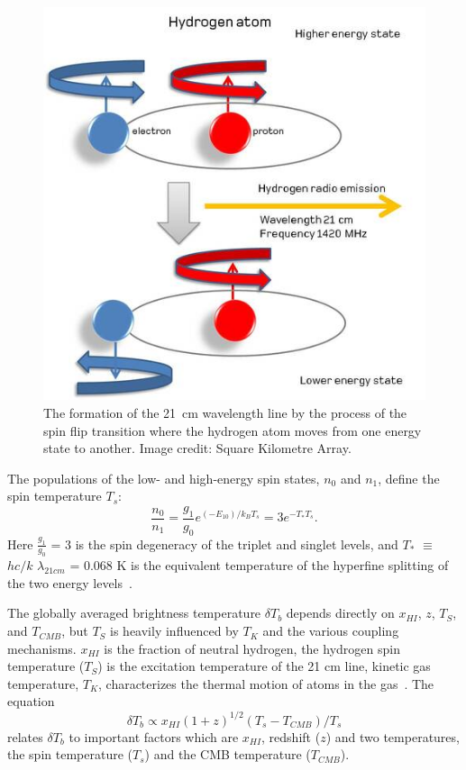 \begin{figure}
	\begin{center}
		\includegraphics[width=0.7\linewidth]{Figures/hydrogenemission1}
		\caption{The formation of the \SI{21}{cm} wavelength line by the process of the spin flip transition where the hydrogen atom moves from one energy state to another. Image credit: {Square Kilometre Array}.}
		\label{Fig:21cm}
	\end{center}
\end{figure}

The populations of the low- and high-energy spin states, $n_0$ and $n_1$, define the spin temperature $T_s$:
\begin{equation}
\frac{n_0}{n_1} = \frac{g_1}{g_0}e^{(-E_10)/{k_B}{T_s}} = 3e^{{-T_*}{T_s}}.
\end{equation}
Here $\frac{g_1}{g_0}$ = 3 is the spin degeneracy of the triplet and singlet levels, and $T_{*}$ $\equiv$ $hc/k$ $\lambda_{21cm}$ = 0.068 K is the equivalent temperature of the hyperfine splitting of the two energy levels~\citep{2012RPPh...75h6901P}.

The globally averaged brightness temperature $\delta$$T_b$ depends directly on $x_{HI}$, $z$, $T_S$, and $T_{CMB}$, but $T_S$ is heavily influenced by $T_K$ and the various coupling mechanisms. $x_{HI}$ is the fraction of neutral hydrogen, the hydrogen spin temperature ($T_S$) is the excitation temperature of the 21 cm line, kinetic gas temperature, $T_K$, characterizes the thermal motion of atoms in the gas~\citep{2015aska.confE...1K,2006PhR...433..181F}. The equation	
\begin{equation}
\delta{T_b}\propto {x_{HI}}(1+z)^{1/2}({T_s}-{T_{CMB}})/{T_s}
\end{equation}
relates $\delta$$T_b$ to important factors which are \(x_{HI}\), redshift ($z$) and two temperatures, the spin temperature ($T_s$) and the CMB temperature ($T_{CMB}$).

